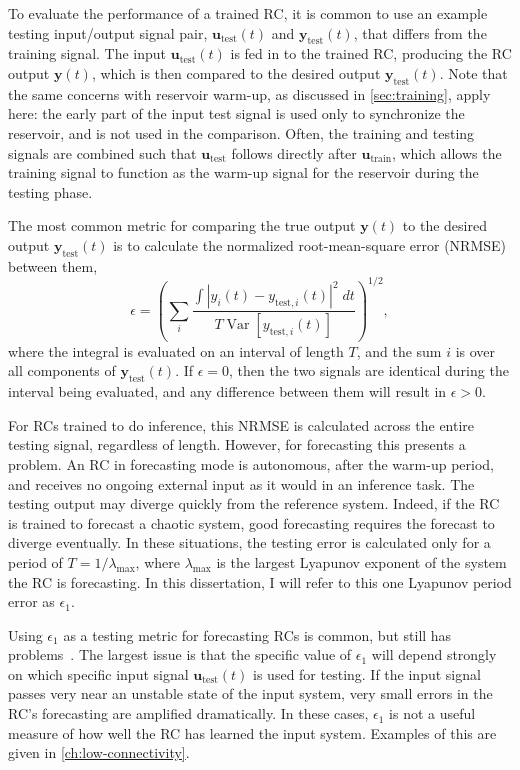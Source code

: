 To evaluate the performance of a trained RC, it is common to use an
example testing input/output signal pair, $\bm{u}_\text{test}(t)$ and
$\bm{y}_\text{test}(t)$, that differs from the training signal. The
input $\bm{u}_\text{test}(t)$ is fed in to the trained RC, producing
the RC output $\bm{y}(t)$, which is then compared to the desired
output $\bm{y}_\text{test}(t)$. Note that the same concerns with
reservoir warm-up, as discussed in \cref{sec:training}, apply here: the
early part of the input test signal is used only to synchronize the
reservoir, and is not used in the comparison. Often, the training and
testing signals are combined such that $\bm{u}_\text{test}$ follows
directly after $\bm{u}_\text{train}$, which allows the training signal
to function as the warm-up signal for the reservoir during the testing
phase.

The most common metric for comparing the true output $\bm{y}(t)$ to
the desired output $\bm{y}_\text{test}(t)$ is to calculate the
normalized root-mean-square error (NRMSE) between them,
\begin{equation}
  \label{eq:nrmse}
  \epsilon = {\left(\sum_i\frac{\int \left| y_i(t) - y_{\text{test},i}(t) \right|^2 \;dt}{T \operatorname{Var}\left[y_{\text{test},i}(t)\right]}\right)}^{1/2},
\end{equation}
where the integral is evaluated on an interval of length $T$, and the
sum $i$ is over all components of $\bm{y}_\text{test}(t)$.  If
$\epsilon = 0$, then the two signals are identical during the interval
being evaluated, and any difference between them will result in
$\epsilon > 0$.

For RCs trained to do inference, this NRMSE is calculated across the
entire testing signal, regardless of length. However, for forecasting
this presents a problem. An RC in forecasting mode is autonomous,
after the warm-up period, and receives no ongoing external input as it
would in an inference task. The testing output may diverge quickly
from the reference system. Indeed, if the RC is trained to forecast a
chaotic system, good forecasting requires the forecast to diverge
eventually. In these situations, the testing error is calculated only
for a period of $T = 1/\lambda_\text{max}$, where $\lambda_\text{max}$
is the largest Lyapunov exponent of the system the RC is
forecasting. In this dissertation, I will refer to this one Lyapunov period
error as $\epsilon_1$.

Using $\epsilon_1$ as a testing metric for forecasting RCs is common,
but still has problems~\cite{pathak2017,haluszczynski2019}. The largest
issue is that the specific value of $\epsilon_1$ will depend strongly
on which specific input signal $\bm{u}_\text{test}(t)$ is used for
testing. If the input signal passes very near an unstable state of the
input system, very small errors in the RC's forecasting are amplified
dramatically. In these cases, $\epsilon_1$ is not a useful measure of
how well the RC has learned the input system. Examples of this are
given in \cref{ch:low-connectivity}.

